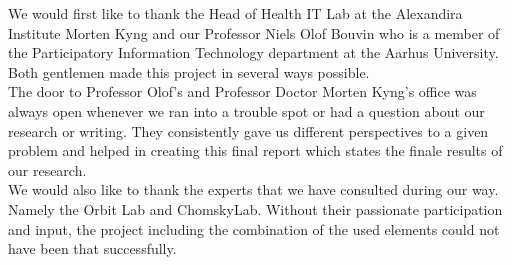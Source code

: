 \thispagestyle{empty}
{}

\vspace*{3cm}

\begin{center}
	\bigskip
	\bigskip
	\bigskip
    We would first like to thank the Head of Health IT Lab at the Alexandira Institute Morten Kyng and our Professor Niels Olof Bouvin who is a member of the Participatory Information Technology department at the Aarhus University. Both gentlemen made this project in several ways possible.\\
    \bigskip
    \bigskip
    \bigskip
    The door to Professor Olof's and Professor Doctor Morten Kyng's office was always open whenever we ran into a trouble spot or had a question about our research or writing. They consistently gave us different perspectives to a given problem and helped in creating this final report which states the finale results of our research.\\
    \bigskip
    \bigskip
    \bigskip
    We would also like to thank the experts that we have consulted during our way. Namely the Orbit Lab and ChomskyLab. Without their passionate participation and input, the project including the combination of the used elements could not have been that successfully.\\
\end{center}

\medskip
